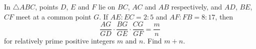 In $\triangle ABC$, points $D$, $E$ and $F$ lie on $BC$, $AC$ and $AB$ respectively, and $AD$, $BE$, $CF$ meet at a common point $G$. If $AE:EC=2:5$ and $AF:FB=8:17$, then
\[
\dfrac{AG}{GD}\cdot\dfrac{BG}{GE}\cdot\dfrac{CG}{GF}=\dfrac{m}{n}
\]
for relatively prime positive integers $m$ and $n$. Find $m+n$.
